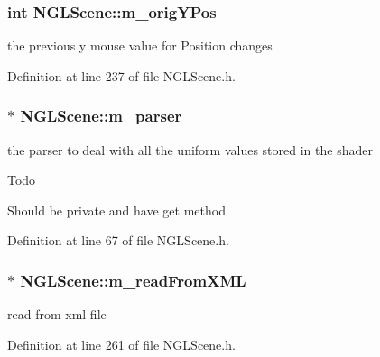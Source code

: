 \subsubsection[{m\-\_\-orig\-Y\-Pos}]{\setlength{\rightskip}{0pt plus 5cm}int N\-G\-L\-Scene\-::m\-\_\-orig\-Y\-Pos\hspace{0.3cm}{\ttfamily [private]}}\label{class_n_g_l_scene_a8222af8d2460d216d9cf0a008c6d5a53}


the previous y mouse value for Position changes 



Definition at line 237 of file N\-G\-L\-Scene.\-h.

\subsubsection[{m\-\_\-parser}]{$\ast$ N\-G\-L\-Scene\-::m\-\_\-parser}\label{class_n_g_l_scene_afd08c33ef57873bcc49635971a5d94f8}


the parser to deal with all the uniform values stored in the shader 

\begin{DoxyRefDesc}{Todo}
\item[{\bf Todo}]Should be private and have get method \end{DoxyRefDesc}


Definition at line 67 of file N\-G\-L\-Scene.\-h.

\subsubsection[{m\-\_\-read\-From\-X\-M\-L}]{$\ast$ N\-G\-L\-Scene\-::m\-\_\-read\-From\-X\-M\-L\hspace{0.3cm}{\ttfamily [private]}}\label{class_n_g_l_scene_a2ef5cf8adbe0058a2524d8b98dfbe6c8}


read from xml file 



Definition at line 261 of file N\-G\-L\-Scene.\-h.

